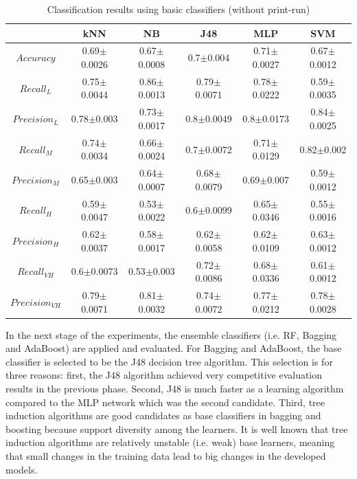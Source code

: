 \documentclass[a4paper,10pt,twocolumn,preprint,3p]{elsarticle}
\begin{document}
\begin{table}
\caption{Classification results using basic classifiers (without print-run)}
\centering{}%
\begin{tabular}{|c|c|c|c|c|c|}
\hline 
 & kNN  & NB  & J48  & MLP  & SVM\tabularnewline
\hline 
\hline 
$Accuracy$  & 0.69$\pm$0.0026 & 0.67$\pm$0.0008 & 0.7$\pm$0.004 & 0.71$\pm$0.0027 & 0.67$\pm$0.0012\tabularnewline
\hline 
\hline 
$Recall_{L}$  & 0.75$\pm$0.0044 & 0.86$\pm$0.0013 & 0.79$\pm$0.0071 & 0.78$\pm$0.0222 & 0.59$\pm$0.0035\tabularnewline
\hline 
$Precision_{L}$  & 0.78$\pm$0.003 & 0.73$\pm$0.0017 & 0.8$\pm$0.0049 & 0.8$\pm$0.0173 & 0.84$\pm$0.0025\tabularnewline
\hline 
\hline 
$Recall_{M}$  & 0.74$\pm$0.0034 & 0.66$\pm$0.0024 & 0.7$\pm$0.0072 & 0.71$\pm$0.0129 & 0.82$\pm$0.002\tabularnewline
\hline 
$Precision_{M}$  & 0.65$\pm$0.003 & 0.64$\pm$0.0007 & 0.68$\pm$0.0079 & 0.69$\pm$0.007 & 0.59$\pm$0.0012\tabularnewline
\hline 
\hline 
$Recall_{H}$  & 0.59$\pm$0.0047 & 0.53$\pm$0.0022 & 0.6$\pm$0.0099 & 0.65$\pm$0.0346 & 0.55$\pm$0.0016\tabularnewline
\hline 
$Precision_{H}$  & 0.62$\pm$0.0037 & 0.58$\pm$0.0017 & 0.62$\pm$0.0058 & 0.62$\pm$0.0109 & 0.63$\pm$0.0012\tabularnewline
\hline 
\hline 
$Recall_{VH}$  & 0.6$\pm$0.0073 & 0.53$\pm$0.003 & 0.72$\pm$0.0086 & 0.68$\pm$0.0336 & 0.61$\pm$0.0012\tabularnewline
\hline 
$Precision_{VH}$  & 0.79$\pm$0.0071 & 0.81$\pm$0.0032 & 0.74$\pm$0.0072 & 0.77$\pm$0.0212 & 0.78$\pm$0.0028\tabularnewline
\hline 
\end{tabular}
\label{table:basic_classifiers}
\end{table}


In the next stage of the experiments, the ensemble classifiers (i.e. RF, Bagging and AdaBoost) are applied and evaluated. For Bagging and AdaBoost, the base classifier is selected to be the J48 decision tree algorithm. This selection is for three reasons: first, the J48 algorithm achieved very competitive evaluation results in the previous phase. Second, J48 is much faster as a learning algorithm compared to the MLP network which was the second candidate. Third, tree induction algorithms are good candidates as base classifiers in bagging and boosting because support diversity among the learners. It is well known that tree induction algorithms are relatively unstable (i.e. weak) base learners, meaning that small changes in the training data lead to big changes in the developed models. 
\end{document}
